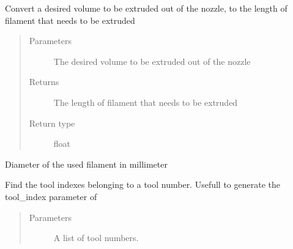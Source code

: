 \documentclass[letterpaper,10pt,english]{sphinxmanual}
\begin{document}
\begin{fulllineitems}
\begin{fulllineitems}
\label{\detokenize{index:generator.generator.extrusion_volume_to_length}}
\sphinxAtStartPar
Convert a desired volume to be extruded out of the nozzle, to the length of filament that needs to be extruded
\begin{quote}\begin{description}
\item[{Parameters}] \leavevmode
\sphinxAtStartPar
{} \textendash{} The desired volume to be extruded out of the nozzle

\item[{Returns}] \leavevmode
\sphinxAtStartPar
The length of filament that needs to be extruded

\item[{Return type}] \leavevmode
\sphinxAtStartPar
float

\end{description}\end{quote}

\end{fulllineitems}


\begin{fulllineitems}
\label{\detokenize{index:generator.generator.filament_diameter}}
\sphinxAtStartPar
Diameter of the used filament in millimeter

\end{fulllineitems}


\begin{fulllineitems}
\label{\detokenize{index:generator.generator.find_tools}}
\sphinxAtStartPar
Find the tool indexes belonging to a tool number. Usefull to generate the tool\_index parameter of {\hyperref[\detokenize{index:generator.generator.tool_change}]{}}
\begin{quote}\begin{description}
\item[{Parameters}] \leavevmode
\sphinxAtStartPar
{} \textendash{} A list of tool numbers.


\end{description}
\end{quote}
\end{fulllineitems}
\end{fulllineitems}
\end{document}
